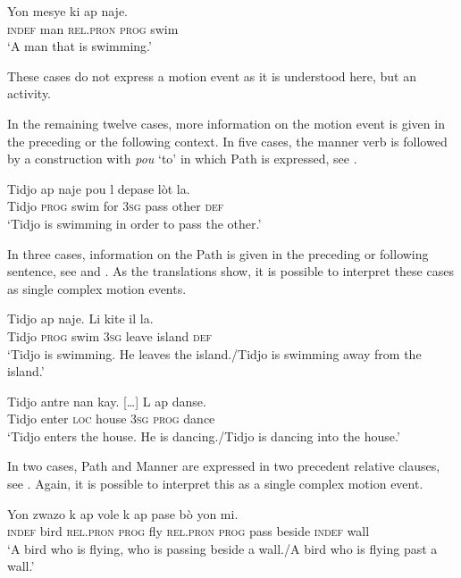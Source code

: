 \documentclass[output=paper,colorlinks,citecolor=brown]{langscibook}
\begin{document}
\ea\label{ex:3:46}
\gll  Yon mesye ki ap naje. \\
      \textsc{indef} man \textsc{rel.pron} \textsc{prog} swim \\
\glt ‘A man that is swimming.’
\z

These cases do not express a motion event as it is understood here, but an activity.

In the remaining twelve cases, more information on the motion event is given in the preceding or the following context. In five cases, the manner verb is followed by a construction with \emph{pou} ‘to’ in which Path is expressed, see .

\ea\label{ex:3:47}
\gll  Tidjo ap naje pou l depase lòt la.\\
      Tidjo \textsc{prog} swim for \textsc{3sg} pass other \textsc{def} \\
\glt ‘Tidjo is swimming in order   to pass the other.'
\z

In three cases, information on the Path is given in the preceding or following sentence, see  and . As the translations show, it is possible to interpret these cases as single complex motion events.

\ea\label{ex:3:48}
\gll Tidjo ap naje. Li kite il la.  \\
     Tidjo \textsc{prog} swim \textsc{3sg} leave island \textsc{def}  \\
\glt ‘Tidjo is swimming. He leaves the island./Tidjo is swimming away from the island.’

\ex\label{ex:3:49}
\gll Tidjo antre nan kay. {[}…{]} L ap danse.\\
     Tidjo enter \textsc{loc} house {} \textsc{3sg} \textsc{prog} dance  \\
\glt ‘Tidjo enters the house. He is dancing./Tidjo is dancing into the house.’
\z

In two cases, Path and Manner are expressed in two precedent relative clauses, see . Again, it is possible to interpret this as a single complex motion event.

\ea\label{ex:3:50} 
\gll Yon zwazo k ap vole k ap pase bò yon mi. \\
     \textsc{indef} bird \textsc{rel.pron} \textsc{prog} fly \textsc{rel.pron} \textsc{prog} pass beside \textsc{indef} wall  \\
\glt ‘A bird who is flying, who is passing beside a wall.\slash A bird who is flying past a wall.'
\z
\end{document}
